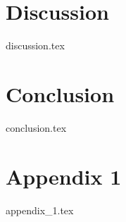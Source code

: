 \documentclass{article} %
\begin{document}
\hypertarget{discussion}{%
\section{Discussion}\label{discussion}}
{discussion.tex}


\hypertarget{conclusion}{%
\section{Conclusion}\label{conclusion}}
{conclusion.tex}


\newpage





\newpage
\appendix %

\hypertarget{appendix1}{%
\section{Appendix 1}\label{appendix1}}
{appendix_1.tex}
\end{document}
